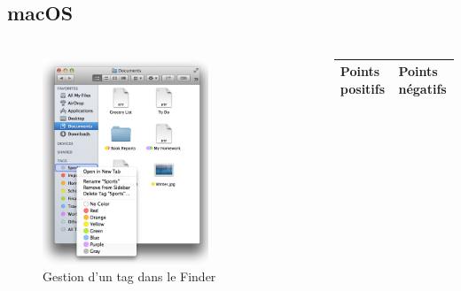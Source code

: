\documentclass[10pt]{beamer}
\begin{document}
\begin{frame}
\begin{columns}[T]
\begin{column}{.6\textwidth}
\begin{flushright}
\begin{figure}
                \end{figure}
            \end{flushright}
        \end{column}
    \end{columns}
\end{frame}

\subsection{macOS}
\begin{frame}
    \frametitle{\subsecname}
    \fontsize{8pt}{9}\selectfont
    \begin{columns}[T]
        \begin{column}{.55\textwidth}
            \begin{center}
                \begin{figure}
                    \includegraphics[width=0.7\textwidth]{images/macos_tags.png}
                    \caption{Gestion d'un tag dans le Finder \cite{ref5}}
                \end{figure}
            \end{center}
        \end{column}
        \pause
        \begin{column}{.45\textwidth}
            \begin{flushleft}
                \begin{tabularx}{5cm}{|X|X|} \hline
                    \textbf{Points positifs} & \textbf{Points négatifs} \\ \hline

\end{tabularx}
\end{flushleft}
\end{column}
\end{columns}
\end{frame}
\end{document}
